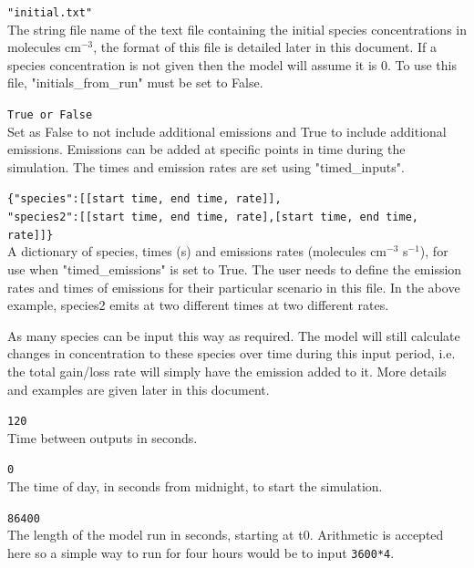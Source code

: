 \documentclass[a4paper]{refart}
\begin{document}
\texttt{"initial.txt"}\\
The string file name of the text file containing the initial species concentrations in molecules cm$^{-3}$, the format of this file is detailed later in this document. If a species concentration is not given then the model will assume it is 0. To use this file, "initials\_from\_run" must be set to False.

\label{timed emissions}
\texttt{True or False}\\
Set as False to not include additional emissions and True to include additional emissions. Emissions can be added at specific points in time during the simulation. The times and emission rates are set using "timed\_inputs".

\texttt{\{"species":[[start time, end time, rate]],\\
          "species2":[[start time, end time, rate],[start time, end time, rate]]\}}\\
A dictionary of species, times (s) and emissions rates  (molecules cm$^{-3}$ s$^{-1}$), for use when "timed\_emissions" is set to True. The user needs to define the emission rates and times of emissions for their particular scenario in this file. In the above example, species2 emits at two different times at two different rates.

 As many species can be input this way as required. The model will still calculate changes in concentration to these species over time during this input period, i.e. the total gain/loss rate will simply have the emission added to it. More details and examples are given later in this document.

\texttt{120}\\
Time between outputs in seconds. 

\texttt{0}\\
The time of day, in seconds from midnight, to start the simulation. 

\texttt{86400}\\
The length of the model run in seconds, starting at t0. Arithmetic is accepted here so a simple way to run for four hours would be to input \texttt{3600*4}.
\end{document}
